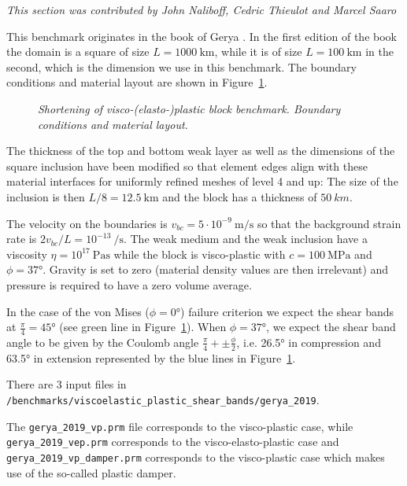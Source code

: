 \textit{This section was contributed by John Naliboff, Cedric Thieulot and Marcel Saaro}

This benchmark originates in the book of Gerya \cite{gery10}. 
In the first edition of the book the domain is a square of size 
$L=1000~\si{\km}$, while it is of size $L=100~\si{\km}$ in the second, which is the dimension we use in this benchmark. The boundary conditions and material layout are shown in Figure~\ref{fig:shortening_vp_block}.

\begin{figure}[htp!]
\centering

\caption{\it Shortening of visco-(elasto-)plastic block benchmark. Boundary conditions and material layout. }
\label{fig:shortening_vp_block}
\end{figure}

The thickness of the top and bottom weak layer
as well as the dimensions of the square inclusion have been modified so 
that element edges align with these material interfaces 
for uniformly refined meshes of level 4 and up: The size of the inclusion is then $L/8=12.5~\si{\km}$ and the block has a thickness of $50~\si{km}$.

The velocity on the boundaries is $v_{bc}=5\cdot 10^{-9}~\si{\meter\per\second}$ so that the background strain rate is  
$2 v_{bc}/L = 10^{-13}~\si{\per\second}$.
The weak medium and the weak inclusion have a viscosity 
$\eta=10^{17}~\si{\pascal\second}$ while 
the block is visco-plastic with $c=100~\si{\mega\pascal}$ and $\phi=37\si{\degree}$. 
Gravity is set to zero (material density values are then irrelevant) and pressure is required to have a zero volume average.

In the case of the von Mises ($\phi=0\si{\degree}$) failure criterion we expect the shear bands at $\frac{\pi}{4}=45\si{\degree}$ (see green line in Figure~\ref{fig:shortening_vp_block}). 
When $\phi=37\si{\degree}$, we expect the shear band angle to be 
given by the Coulomb angle $\frac{\pi}{4} +\pm \frac{\phi}{2}$, i.e. 26.5\si{\degree} in compression and 63.5\si{\degree} in extension
represented by the blue lines in Figure~\ref{fig:shortening_vp_block}. 


There are 3 input files in \verb|/benchmarks/viscoelastic_plastic_shear_bands/gerya_2019|.

The \verb|gerya_2019_vp.prm| file corresponds to the visco-plastic case, while \verb|gerya_2019_vep.prm| corresponds to the visco-elasto-plastic case and \verb|gerya_2019_vp_damper.prm| 
corresponds to the visco-plastic case which makes use of the so-called plastic damper.

